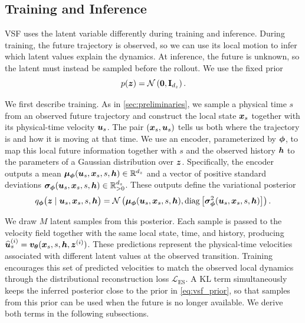 \subsection{Training and Inference}
\label{sec:vsf-training-inference}

VSF uses the latent variable differently during training and inference. During
training, the future trajectory is observed, so we can use its local motion to
infer which latent values explain the dynamics. At inference, the
future is unknown, so the latent must instead be sampled before the rollout.
We use the fixed prior
\begin{equation}
p({\bm{z}})
=
\mathcal N
\left(
\mathbf{0},
\mathbf{I}_{d_z}
\right).
\label{eq:vsf_prior}
\end{equation}

We first describe training. As in \cref{sec:preliminaries}, we sample a
physical time $s$ from an observed future trajectory and construct the local
state ${\bm{x}}_s$ together with its physical-time velocity ${\bm{u}}_s$. The pair
$({\bm{x}}_s,{\bm{u}}_s)$ tells us both where the trajectory is and how it is moving at
that time. We use an encoder, parameterized by $\boldsymbol{\phi}$, to map this local
future information together with $s$ and the observed history ${\bm{h}}$ to the
parameters of a Gaussian distribution over ${\bm{z}}$. Specifically, the encoder
outputs a mean
$\boldsymbol{\mu}_{\boldsymbol{\phi}}({\bm{u}}_s,{\bm{x}}_s,s,{\bm{h}})\in\mathbb R^{d_z}$
and a vector of positive standard deviations
$\boldsymbol{\sigma}_{\boldsymbol{\phi}}({\bm{u}}_s,{\bm{x}}_s,s,{\bm{h}})\in\mathbb R_{>0}^{d_z}$.
These outputs define the variational posterior
\begin{equation}
q_{\boldsymbol{\phi}}
\bigl(
{\bm{z}}
\mid
{\bm{u}}_s,{\bm{x}}_s,s,{\bm{h}}
\bigr)
=
\mathcal N
\left(
\boldsymbol{\mu}_{\boldsymbol{\phi}}({\bm{u}}_s,{\bm{x}}_s,s,{\bm{h}}),
\operatorname{diag}
\left[
\boldsymbol{\sigma}_{\boldsymbol{\phi}}^2({\bm{u}}_s,{\bm{x}}_s,s,{\bm{h}})
\right]
\right).
\label{eq:vsf_variational_posterior}
\end{equation}

We draw $M$ latent samples from this posterior. Each sample is passed to the
velocity field together with the same local state, time, and history,
producing
$\widehat{{\bm{u}}}_s^{(i)}
=
{\bm{v}}_{{\bm{\theta}}}({\bm{x}}_s,s,{\bm{h}},{\bm{z}}^{(i)})$.
These predictions represent the physical-time velocities associated with
different latent values at the observed transition. Training encourages this
set of predicted velocities to match the observed local dynamics through the
distributional reconstruction loss $\mathcal L_{\mathrm{ES}}$. A KL term
simultaneously keeps the inferred posterior close to the prior in
\cref{eq:vsf_prior}, so that samples from this prior can be used when the
future is no longer available. We derive both terms in the following
subsections.

